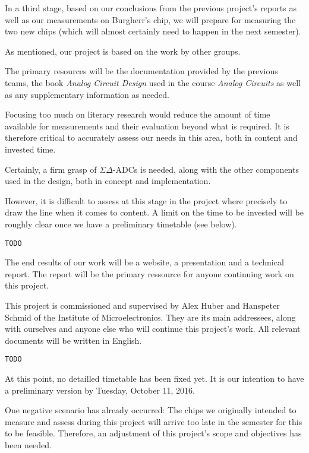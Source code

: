 \documentclass[a4paper,10pt]{article}
\begin{document}
\begin{description}[align=left]
        In a third stage, based on our conclusions from the previous project's
        reports  as well  as  our  measurements on  Burgherr's  chip, we  will
        prepare for measuring  the two new chips (which  will almost certainly
        need to happen in the next semester).
    \item[Preceding Work:]
        As mentioned, our project is based on the work by other groups.
    \item[Sources:]
        The  primary  resources will  be  the  documentation provided  by  the
        previous  teams, the  book \emph{Analog  Circuit Design}  used in  the
        course \emph{Analog Circuits} as well as any supplementary information
        as needed.
    \item[Scope of Literary Research:]
        Focusing too much on literary research would reduce the amount of time
        available  for  measurements  and  their  evaluation  beyond  what  is
        required. It is therefore  critical to accurately assess  our needs in
        this area, both in content and invested time.

        Certainly, a firm  grasp of $\Sigma\Delta$-ADCs is  needed, along with
        the  other  components  used  in  the  design,  both  in  concept  and
        implementation.

        However, it is difficult to assess  at this stage in the project where
        precisely to  draw the line when  it comes to content. A  limit on the
        time to be  invested will be roughly clear once  we have a preliminary
        timetable (see below).
    \item[Scope of Experiments:] \texttt{TODO}
    \item[Genre and Addressees:]
        The end results  of our work will  be a website, a  presentation and a
        technical report. The report will be  the primary ressource for anyone
        continuing work on this project.

        This  project  is  commissioned  and  supervised  by  Alex  Huber  and
        Hanspeter Schmid  of the  Institute of Microelectronics. They  are its
        main  addressees,  along  with  ourselves and  anyone  else  who  will
        continue this project's work.  All  relevant documents will be written
        in English.
    \item[Preliminary Structuring:] \texttt{TODO}
    \item[Timetable:]
        At this  point, no detailled timetable  has been fixed yet. It  is our
        intention to have a preliminary version by Tuesday, October 11, 2016.
    \item[Risk Assessment:]
        One negative  scenario has  already occurred: The chips  we originally
        intended to  measure and  assess during this  project will  arrive too
        late in the semester for this to be feasible. Therefore, an adjustment
        of this project's scope and objectives has been needed.


\end{description}
\end{document}

